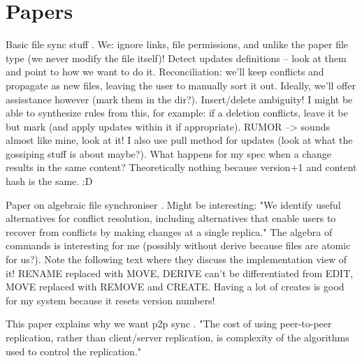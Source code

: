 \section{Papers}


Basic file sync stuff \cite{balasubramaniam1998file}.
We: ignore links, file permissions, and unlike the paper file type (we never modify the file itself)!
Detect updates definitions – look at them and point to how we want to do it.
Reconciliation: we'll keep conflicts and propagate as new files, leaving the user to manually sort it out.
Ideally, we'll offer assisstance however (mark them in the dir?).
Insert/delete ambiguity!
I might be able to synthesize rules from this, for example: if a deletion conflicts, leave it be but mark (and apply updates within it if appropriate).
RUMOR --> sounds almost like mine, look at it!
I also use pull method for updates (look at what the gossiping stuff is about maybe?).
What happens for my spec when a change results in the same content?
Theoretically nothing because version+1 and content hash is the same. :D

Paper on algebraic file synchroniser \cite{ramsey2001algebraic}.
Might be interesting: "We identify useful alternatives for conflict resolution, including alternatives that enable users to recover from conflicts by making changes at a single replica."
The algebra of commands is interesting for me (possibly without derive because files are atomic for us?).
Note the following text where they discuss the implementation view of it!
RENAME replaced with MOVE, DERIVE can't be differentiated from EDIT, MOVE replaced with REMOVE and CREATE.
Having a lot of creates is good for my system because it resets version numbers!

This paper explains why we want p2p sync \cite{reiher1996peer}.
"The cost of using peer-to-peer replication, rather than client/server replication, is complexity of the algorithms used to control the replication."

